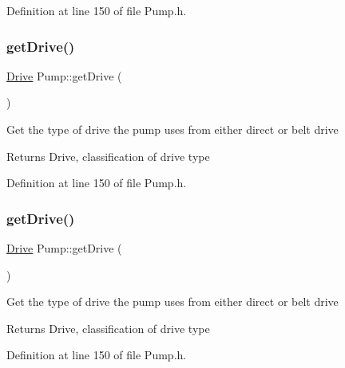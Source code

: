 Definition at line 150 of file Pump.\+h.

\mbox{\label{class_pump_a7eae412e42d0a3351408391cd5fbef4e}} 
\subsubsection{\texorpdfstring{get\+Drive()}{getDrive()}\hspace{0.1cm}{\footnotesize\ttfamily [2/3]}}
{\footnotesize\ttfamily \hyperlink{class_pump_a32bf0ade131a11bb3b3fb374f638e983}{Drive} Pump\+::get\+Drive (\begin{DoxyParamCaption}{ }\end{DoxyParamCaption})\hspace{0.3cm}{\ttfamily [inline]}}

Get the type of drive the pump uses from either direct or belt drive

\begin{DoxyReturn}{Returns}
Drive, classification of drive type 
\end{DoxyReturn}


Definition at line 150 of file Pump.\+h.

\mbox{\label{class_pump_a7eae412e42d0a3351408391cd5fbef4e}} 
\subsubsection{\texorpdfstring{get\+Drive()}{getDrive()}\hspace{0.1cm}{\footnotesize\ttfamily [3/3]}}
{\footnotesize\ttfamily \hyperlink{class_pump_a32bf0ade131a11bb3b3fb374f638e983}{Drive} Pump\+::get\+Drive (\begin{DoxyParamCaption}{ }\end{DoxyParamCaption})\hspace{0.3cm}{\ttfamily [inline]}}

Get the type of drive the pump uses from either direct or belt drive

\begin{DoxyReturn}{Returns}
Drive, classification of drive type 
\end{DoxyReturn}


Definition at line 150 of file Pump.\+h.

